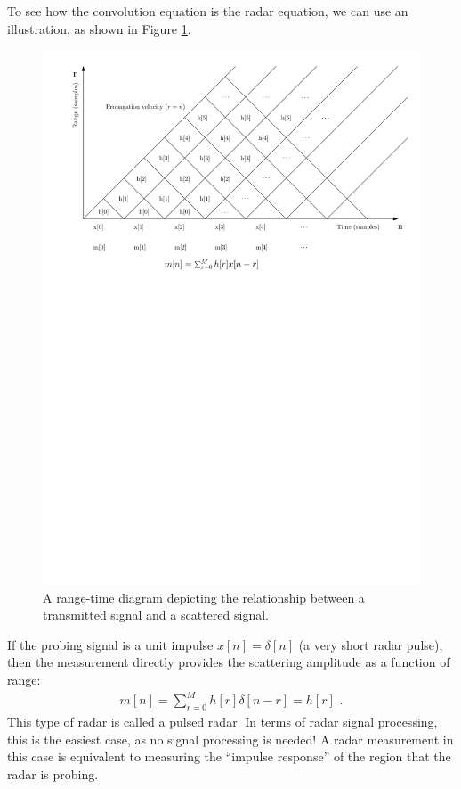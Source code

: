 To see how the convolution equation is the radar equation, we can use
an illustration, as shown in Figure \ref{fig:range_time_diagram}.
\begin{figure}
\begin{center}
\includegraphics[width=\textwidth]{Applications/figures/rd.pdf}
\end{center}
\caption{A range-time diagram depicting the relationship between a transmitted signal and a scattered signal.}
\label{fig:range_time_diagram}
\end{figure}

If the probing signal is a unit impulse $x[n]=\delta[n]$ (a very short
radar pulse), then the measurement directly provides the scattering
amplitude as a function of range:
\begin{align}
m[n] = \sum_{r=0}^M h[r]\delta[n-r] = h[r]\,\,.
\end{align}
This type of radar is called a pulsed radar. In terms of radar
signal processing, this is the easiest case, as no signal processing
is needed! A radar measurement in this case is equivalent to measuring
the ``impulse response'' of the region that the radar is probing.

